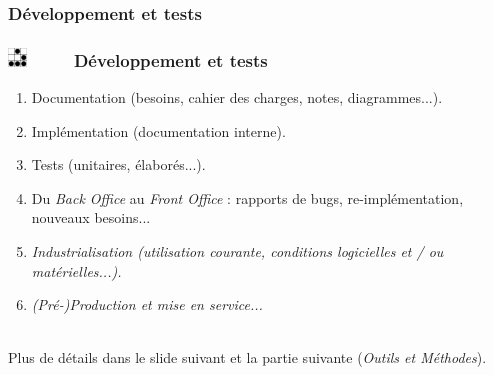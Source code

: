 \documentclass[slidetop,11pt]{beamer}
\def\sectionPartIaDE{D{\'e}veloppement et tests}
\def\sectionPartId{Outils et M{\'e}thodes}
\def\moreInFrameTitle{\includegraphics[height=0.5cm]{img/logo_glider.png}~~~~~}
\begin{document}
\subsubsection{\sectionPartIaDE}
\begin{frame}
	\frametitle{\moreInFrameTitle \sectionPartIaDE}
	\begin{enumerate}
		\item Documentation (besoins, cahier des charges, notes, diagrammes...). 
		\item Impl{\'e}mentation (documentation interne). 
		\item Tests (unitaires, {\'e}labor{\'e}s...). 
		\item Du \emph{Back Office} au \emph{Front Office} : rapports de bugs, re-impl{\'e}mentation, nouveaux besoins... 
		\item \emph{Industrialisation (utilisation courante, conditions logicielles et / ou mat{\'e}rielles...). }
		\item \emph{(Pr{\'e}-)Production et mise en service...}
	\end{enumerate}~\\
	Plus de d{\'e}tails dans le slide suivant et la partie suivante (\emph{\sectionPartId}). 
\end{frame} 
\end{document}
